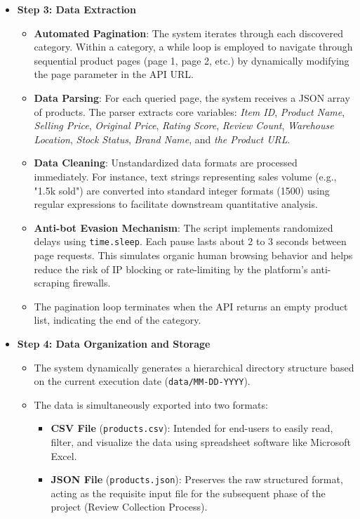 \begin{itemize}
            \item \textbf{Step 3: Data Extraction}
            \begin{itemize}
                \item \textbf{Automated Pagination}: The system iterates through each discovered category. Within a category, a while loop is employed to navigate through sequential product pages (page 1, page 2, etc.) by dynamically modifying the page parameter in the API URL.
                \item \textbf{Data Parsing}: For each queried page, the system receives a JSON array of products. The parser extracts core variables: \textit{Item ID}, \textit{Product Name}, \textit{Selling Price}, \textit{Original Price}, \textit{Rating Score}, \textit{Review Count}, \textit{Warehouse Location}, \textit{Stock Status}, \textit{Brand Name}, and \textit{the Product URL}.
                \item \textbf{Data Cleaning}: Unstandardized data formats are processed immediately. For instance, text strings representing sales volume (e.g., "1.5k sold") are converted into standard integer formats (1500) using regular expressions to facilitate downstream quantitative analysis.
                \item \textbf{Anti-bot Evasion Mechanism}: The script implements randomized delays using \texttt{time.sleep}. Each pause lasts about 2 to 3 seconds between page requests. This simulates organic human browsing behavior and helps reduce the risk of IP blocking or rate-limiting by the platform's anti-scraping firewalls.
                \item The pagination loop terminates when the API returns an empty product list, indicating the end of the category.
            \end{itemize}

            \item \textbf{Step 4: Data Organization and Storage}
            \begin{itemize}
                \item The system dynamically generates a hierarchical directory structure based on the current execution date (\texttt{data/MM-DD-YYYY}).
                \item The data is simultaneously exported into two formats:
                \begin{itemize}
                    \item \textbf{CSV File} (\texttt{products.csv}): Intended for end-users to easily read, filter, and visualize the data using spreadsheet software like Microsoft Excel.
                    \item \textbf{JSON File} (\texttt{products.json}): Preserves the raw structured format, acting as the requisite input file for the subsequent phase of the project (Review Collection Process).
                \end{itemize}
            \end{itemize}
        \end{itemize}

